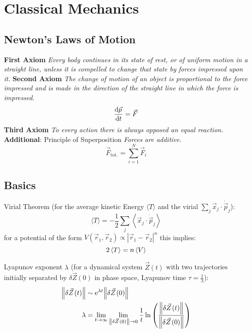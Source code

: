 \section{Classical Mechanics}
	\subsection{Newton's Laws of Motion}
		\textbf{First Axiom} \newline
		\indent \textit{Every body continues in its state of rest, or of uniform motion in a straight line, unless it is compelled to change that state by forces impressed upon it.} \nl
		\textbf{Second Axiom} \newline
		\indent \textit{The change of motion of an object is proportional to the force impressed and is made in the direction of the straight line in which the force is impressed.}
		\begin{equation}
			\dv{\vec{p}}{t} = \vec{F}
		\end{equation}\nl
		\textbf{Third Axiom} \newline
		\indent \textit{To every action there is always opposed an equal reaction.} \nl
		\textbf{Additional}: Principle of Superposition \newline
		\indent \textit{Forces are additive.}
		\begin{equation}
			\vec{F}_{\text{tot.}} = \sum_{i=1}^{N} \vec{F}_i
		\end{equation}

	\subsection{Basics}
		\noindent
		Virial Theorem (for the average kinetic Energy $\langle T \rangle$ and the virial $\sum_j \vec{x}_j\cdot\dot{\vec{p}}_j$):
		\begin{equation}
			\langle T \rangle = - \frac{1}{2} \sum_j \left\langle \vec{x}_j\cdot\dot{\vec{p}}_j \right\rangle
		\end{equation}
		for a potential of the form $V(\vec{r}_1,\vec{r}_2) \propto |\vec{r}_1-\vec{r}_2|^n$ this implies:
		\begin{equation}
			2\left\langle T \right\rangle = n\left\langle V \right\rangle
		\end{equation}

		\noindent
		Lyapunov exponent $\lambda$ (for a dynamical system $\vec{Z}(t)$ with two trajectories initially separated by $\delta\vec{Z}(0)$ in phase space, Lyapunov time $\tau=\frac{1}{\lambda}$):
		\begin{equation}
			\begin{aligned}
				\norm{\delta\vec{Z}(t)} &\sim \ex^{\lambda t} \norm{\delta\vec{Z}(0)}\\
				\lambda &= \lim_{t\rightarrow\infty} \lim_{\norm{\delta\vec{Z}(0)}\rightarrow 0} \frac{1}{t} \ln\qty(\frac{\norm{\delta \vec{Z}(t)}}{\norm{\delta\vec{Z}(0)}}) \\
			\end{aligned}
		\end{equation}

